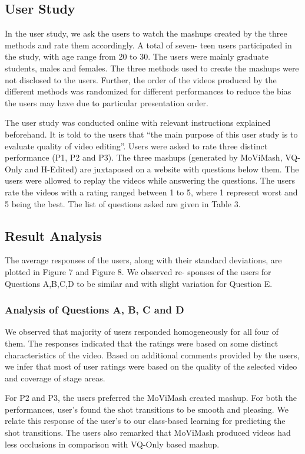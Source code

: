 \documentclass{sig-alternate}
\begin{document}
\subsection{User Study}
In the user study, we ask the users to watch the mashups created
by the three methods and rate them accordingly. A total of seven-
teen users participated in the study, with age range from 20 to 30.
The users were mainly graduate students, males and females. The
three methods used to create the mashups were not disclosed to the
users. Further, the order of the videos produced by the different
methods was randomized for different performances to reduce the
bias the users may have due to particular presentation order.

The user study was conducted online with relevant instructions
explained beforehand. It is told to the users that “the main purpose
of this user study is to evaluate quality of video editing”. Users
were asked to rate three distinct performance (P1, P2 and P3). The
three mashups (generated by MoViMash, VQ-Only and H-Edited)
are juxtaposed on a website with questions below them. The users
were allowed to replay the videos while answering the questions.
The users rate the videos with a rating ranged between 1 to 5, where
1 represent worst and 5 being the best. The list of questions asked
are given in Table 3.

\subsection{Result Analysis}
The average responses of the users, along with their standard
deviations, are plotted in Figure 7 and Figure 8. We observed re-
sponses of the users for Questions A,B,C,D to be similar and with
slight variation for Question E.
\subsubsection{Analysis of Questions A, B, C and D}
We observed that majority of users responded homogeneously
for all four of them. The responses indicated that the ratings were
based on some distinct characteristics of the video. Based on additional comments provided by the users, we infer that most of user ratings were based on the quality of the selected video and coverage
of stage areas.

For P2 and P3, the users preferred the MoViMash created mashup.
For both the performances, user’s found the shot transitions to be
smooth and pleasing. We relate this response of the user’s to our
class-based learning for predicting the shot transitions. The users
also remarked that MoViMash produced videos had less occlusions
in comparison with VQ-Only based mashup.
\end{document}
